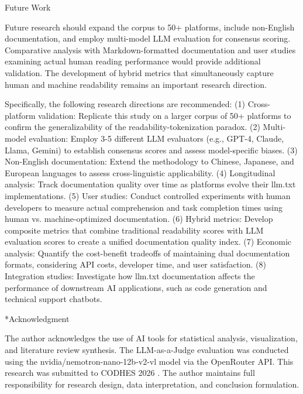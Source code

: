 \documentclass[10pt,conference,a4paper]{IEEEtran}
\makeatletter
\let\oldsection\section
\let\oldsubsection\subsection
\renewcommand{\section}{%
    \@ifstar{\sectionStar}{\sectionNoStar}%
}
\newcommand{\sectionStar}[1]{%
    \oldsection*{#1}%
    \vspace{-4pt}%
}
\newcommand{\sectionNoStar}[1]{%
    \oldsection{#1}%
    \vspace{-4pt}%
}
\renewcommand{\subsection}{%
    \@ifstar{\subsectionStar}{\subsectionNoStar}%
}
\newcommand{\subsectionStar}[1]{%
    \oldsubsection*{\textit{#1}}%
    \vspace{-3pt}%
}
\newcommand{\subsectionNoStar}[1]{%
    \oldsubsection{\textit{#1}}%
    \vspace{-3pt}%
}
\makeatother
\begin{document}
\subsection{Future Work}

Future research should expand the corpus to 50+ platforms, include non-English documentation, and employ multi-model LLM evaluation for consensus scoring. Comparative analysis with Markdown-formatted documentation and user studies examining actual human reading performance would provide additional validation. The development of hybrid metrics that simultaneously capture human and machine readability remains an important research direction.

Specifically, the following research directions are recommended: (1) Cross-platform validation: Replicate this study on a larger corpus of 50+ platforms to confirm the generalizability of the readability-tokenization paradox. (2) Multi-model evaluation: Employ 3-5 different LLM evaluators (e.g., GPT-4, Claude, Llama, Gemini) to establish consensus scores and assess model-specific biases. (3) Non-English documentation: Extend the methodology to Chinese, Japanese, and European languages to assess cross-linguistic applicability. (4) Longitudinal analysis: Track documentation quality over time as platforms evolve their llm.txt implementations. (5) User studies: Conduct controlled experiments with human developers to measure actual comprehension and task completion times using human vs. machine-optimized documentation. (6) Hybrid metrics: Develop composite metrics that combine traditional readability scores with LLM evaluation scores to create a unified documentation quality index. (7) Economic analysis: Quantify the cost-benefit tradeoffs of maintaining dual documentation formats, considering API costs, developer time, and user satisfaction. (8) Integration studies: Investigate how llm.txt documentation affects the performance of downstream AI applications, such as code generation and technical support chatbots.

\section*{Acknowledgment}

The author acknowledges the use of AI tools for statistical analysis, visualization, and literature review synthesis. The LLM-as-a-Judge evaluation was conducted using the nvidia/nemotron-nano-12b-v2-vl model via the OpenRouter API. This research was submitted to CODHES 2026 \cite{CODHES2026}. The author maintains full responsibility for research design, data interpretation, and conclusion formulation.
\end{document}
